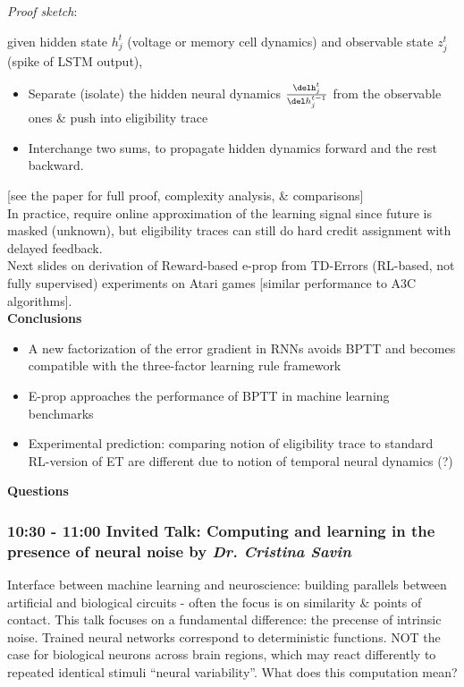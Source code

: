 \documentclass[12pt]{article}
\begin{document}
\textit{Proof sketch}:

given hidden state $h_j^t$ (voltage or memory cell dynamics) and observable state $z_j^t$ (spike of LSTM output), 
\begin{itemize}
    \item Separate (isolate) the hidden neural dynamics $\frac{\delh_j^t}{\del h_j^{t-1}}$ from the observable ones & push into eligibility trace
    \item Interchange two sums, to propagate hidden dynamics forward and the rest backward.
\end{itemize}

[see the paper for full proof, complexity analysis, & comparisons] \\

In practice, require online approximation of the learning signal since future is masked (unknown), but eligibility traces can still do hard credit assignment with delayed feedback. \\

Next slides on derivation of Reward-based e-prop from TD-Errors (RL-based, not fully supervised) experiments on Atari games [similar performance to A3C algorithms]. \\

\textbf{Conclusions} 
\begin{itemize}
    \item A new factorization of the error gradient in RNNs avoids BPTT and becomes compatible with the three-factor learning rule framework
    \item E-prop approaches the performance of BPTT in machine learning benchmarks
    \item Experimental prediction: comparing notion of eligibility trace to standard RL-version of ET are different due to notion of temporal neural dynamics (?)
\end{itemize}

\textbf{Questions} \\ 


\subsubsection{10:30 - 11:00 Invited Talk: Computing and learning in the presence of neural noise by \textit{Dr. Cristina Savin}}

Interface between machine learning and neuroscience: building parallels between artificial and biological circuits - often the focus is on similarity \& points of contact. This talk focuses on a fundamental difference: the precense of intrinsic noise. Trained neural networks correspond to deterministic functions. NOT the case for biological neurons across brain regions, which may react differently to repeated identical stimuli ``neural variability''. What does this computation mean? \\
\end{document}
